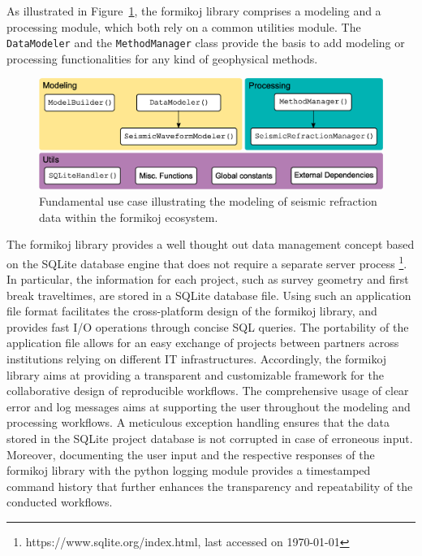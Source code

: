 \documentclass[a4paper,fleqn]{cas-sc}
\begin{document}
As illustrated in Figure~\ref{fig:scheme}, the formikoj library comprises a modeling and a processing module, which both rely on a common utilities module. The \texttt{DataModeler} and the \texttt{MethodManager} class provide the basis to add modeling or processing functionalities for any kind of geophysical methods.
\begin{figure}
	\centering
	\includegraphics[width=.75\textwidth]{figures/package_structure}
	\caption{Fundamental use case illustrating the modeling of seismic refraction data within the formikoj ecosystem.}
	\label{fig:scheme}
\end{figure}
The formikoj library provides a well thought out data management concept based on the SQLite database engine that does not require a separate server process \footnote{https://www.sqlite.org/index.html, last accessed on \today}. In particular, the information for each project, such as survey geometry and first break traveltimes, are stored in a SQLite database file. Using such an application file format facilitates the cross-platform design of the formikoj library, and provides fast I/O operations through concise SQL queries. The portability of the application file allows for an easy exchange of projects between partners across institutions relying on different IT infrastructures. Accordingly, the formikoj library aims at providing a transparent and customizable framework for the collaborative design of reproducible workflows. The comprehensive usage of clear error and log messages aims at supporting the user throughout the modeling and processing workflows. A meticulous exception handling ensures that the data stored in the SQLite project database is not corrupted in case of erroneous input. Moreover, documenting the user input and the respective responses of the formikoj library with the python logging module provides a timestamped command history that further enhances the transparency and repeatability of the conducted workflows.
\end{document}
